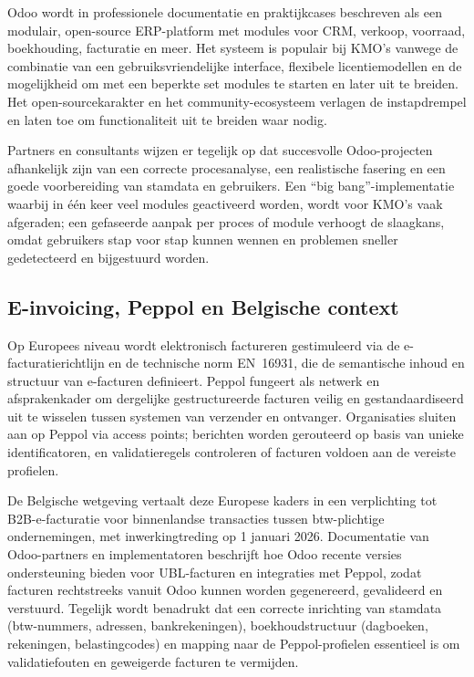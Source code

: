 Odoo wordt in professionele documentatie en praktijkcases beschreven als een modulair, open-source ERP-platform met modules voor CRM, verkoop, voorraad, boekhouding, facturatie en meer.\autocite{SAP_2023} Het systeem is populair bij KMO’s vanwege de combinatie van een gebruiksvriendelijke interface, flexibele licentiemodellen en de mogelijkheid om met een beperkte set modules te starten en later uit te breiden. Het open-sourcekarakter en het community-ecosysteem verlagen de instapdrempel en laten toe om functionaliteit uit te breiden waar nodig.

Partners en consultants wijzen er tegelijk op dat succesvolle Odoo-projecten afhankelijk zijn van een correcte procesanalyse, een realistische fasering en een goede voorbereiding van stamdata en gebruikers.\autocite{Mestica_2024,EezeeIT_nodate} Een “big bang”-implementatie waarbij in één keer veel modules geactiveerd worden, wordt voor KMO’s vaak afgeraden; een gefaseerde aanpak per proces of module verhoogt de slaagkans, omdat gebruikers stap voor stap kunnen wennen en problemen sneller gedetecteerd en bijgestuurd worden.

\subsection{E-invoicing, Peppol en Belgische context}

Op Europees niveau wordt elektronisch factureren gestimuleerd via de e-facturatierichtlijn en de technische norm EN~16931, die de semantische inhoud en structuur van e-facturen definieert.\autocite{EuropeanCommission_2025} Peppol fungeert als netwerk en afsprakenkader om dergelijke gestructureerde facturen veilig en gestandaardiseerd uit te wisselen tussen systemen van verzender en ontvanger. Organisaties sluiten aan op Peppol via access points; berichten worden gerouteerd op basis van unieke identificatoren, en validatieregels controleren of facturen voldoen aan de vereiste profielen.\autocite{EezeeIT_nodate}

De Belgische wetgeving vertaalt deze Europese kaders in een verplichting tot B2B-e-facturatie voor binnenlandse transacties tussen btw-plichtige ondernemingen, met inwerkingtreding op 1 januari 2026.\autocite{Deloitte_2024,EuropeanCommission_2025} Documentatie van Odoo-partners en implementatoren beschrijft hoe Odoo recente versies ondersteuning bieden voor UBL-facturen en integraties met Peppol, zodat facturen rechtstreeks vanuit Odoo kunnen worden gegenereerd, gevalideerd en verstuurd.\autocite{EezeeIT_nodate,Bodoo_2024,Dynapps_2024} Tegelijk wordt benadrukt dat een correcte inrichting van stamdata (btw-nummers, adressen, bankrekeningen), boekhoudstructuur (dagboeken, rekeningen, belastingcodes) en mapping naar de Peppol-profielen essentieel is om validatiefouten en geweigerde facturen te vermijden.

